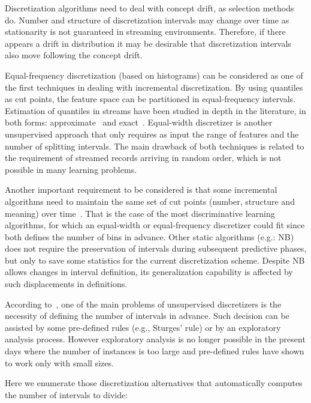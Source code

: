 \documentclass[preprint,12pt]{elsarticle}
\begin{document}
\begin{itemize}
Discretization algorithms need to deal with concept drift, as selection methods do. Number and structure of discretization intervals may change over time as stationarity is not guaranteed in streaming environments. Therefore, if there appears a drift in distribution it may be desirable that discretization intervals also move following the concept drift.

Equal-frequency discretization (based on histograms) can be considered as one of the first techniques in dealing with incremental discretization. By using quantiles as cut points, the feature space can be partitioned in equal-frequency intervals. Estimation of quantiles in streams have been studied in depth in the literature, in both forms: approximate~\cite{ben10, webb14} and exact~\cite{gupta03, guha09}. Equal-width discretizer is another unsupervised approach that only requires as input the range of features and the number of splitting intervals. The main drawback of both techniques is related to the requirement of streamed records arriving in random order, which is not possible in many learning problems. 

Another important requirement to be considered is that some incremental algorithms need to maintain the same set of cut points (number, structure and meaning) over time~\cite{webb14}. That is the case of the most discriminative learning algorithms, for which an equal-width or equal-frequency discretizer could fit since both defines the number of bins in advance. Other static algorithms (e.g.: NB) does not require the preservation of intervals during subsequent predictive phases, but only to save some statistics for the current discretization scheme. Despite NB allows changes in interval definition, its generalization capability is affected by such displacements in definitions.

According to~\cite{gama06}, one of the main problems of unsupervised discretizers is the necessity of defining the number of intervals in advance. Such decision can be assisted by some pre-defined rules (e.g., Sturges' rule) or by an exploratory analysis process. However exploratory analysis is no longer possible in the present days where the number of instances is too large and pre-defined rules have shown to work only with small sizes.

Here we enumerate those discretization alternatives that automatically computes the number of intervals to divide:


\end{itemize}
\end{document}
